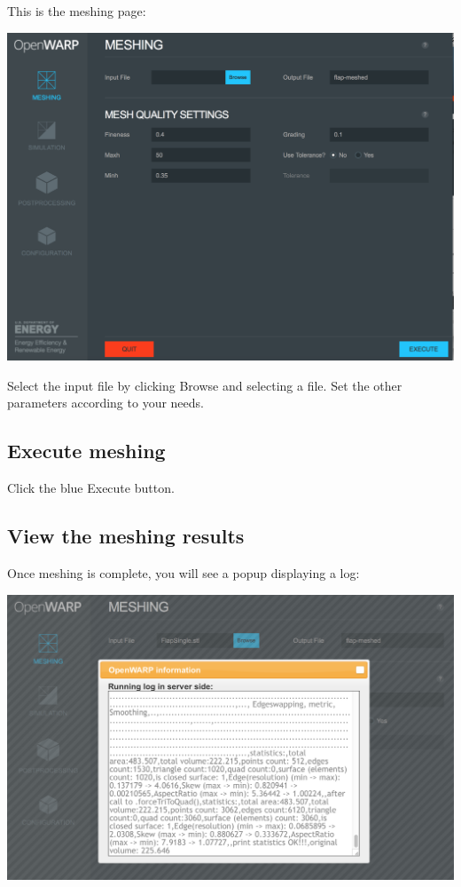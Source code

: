 \documentclass[12pt]{article}
\begin{document}
			This is the meshing page:
			
				\vspace{\abovedisplayskip}
				\begin{minipage}{\linewidth}
					\centering
					\includegraphics[scale=0.4]{img/23}
				\end{minipage}
				\vspace{\belowdisplayskip}
				
				Select the input file by clicking Browse and selecting a file. Set the other parameters according to your needs.
				
				
	\subsection{Execute meshing}
	Click the blue Execute button.
	
	\subsection{View the meshing results}
	Once meshing is complete, you will see a popup displaying a log:
	
	\vspace{\abovedisplayskip}
	\begin{minipage}{\linewidth}
		\centering
		\includegraphics[scale=0.4]{img/24}
	\end{minipage}
	\vspace{\belowdisplayskip}
	
\end{document}
